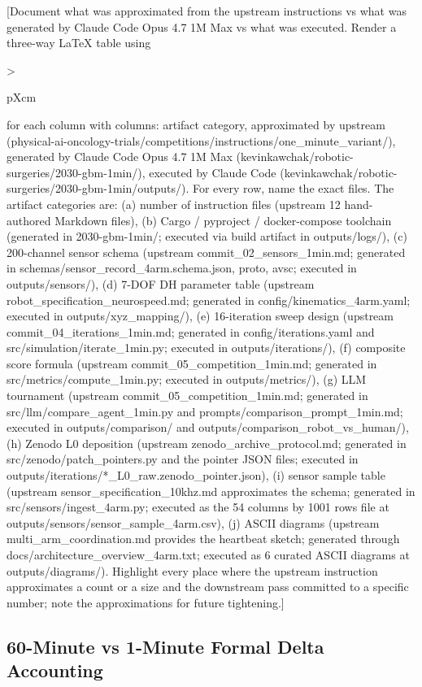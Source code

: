 [Document what was approximated from the upstream instructions vs
what was generated by Claude Code Opus 4.7 1M Max vs what was
executed. Render a three-way LaTeX table using
{>{\raggedright\arraybackslash}p{Xcm}} for each column with columns:
artifact category, approximated by upstream
(physical-ai-oncology-trials/competitions/instructions/one_minute_variant/),
generated by Claude Code Opus 4.7 1M Max
(kevinkawchak/robotic-surgeries/2030-gbm-1min/), executed by Claude
Code (kevinkawchak/robotic-surgeries/2030-gbm-1min/outputs/). For
every row, name the exact files. The artifact categories are: (a)
number of instruction files (upstream 12 hand-authored Markdown
files), (b) Cargo / pyproject / docker-compose toolchain (generated
in 2030-gbm-1min/; executed via build artifact in outputs/logs/),
(c) 200-channel sensor schema (upstream commit_02_sensors_1min.md;
generated in schemas/sensor_record_4arm.{schema.json, proto, avsc};
executed in outputs/sensors/), (d) 7-DOF DH parameter table
(upstream robot_specification_neurospeed.md; generated in
config/kinematics_4arm.yaml; executed in outputs/xyz_mapping/), (e)
16-iteration sweep design (upstream commit_04_iterations_1min.md;
generated in config/iterations.yaml and src/simulation/iterate_1min.py;
executed in outputs/iterations/), (f) composite score formula
(upstream commit_05_competition_1min.md; generated in
src/metrics/compute_1min.py; executed in outputs/metrics/), (g) LLM
tournament (upstream commit_05_competition_1min.md; generated in
src/llm/compare_agent_1min.py and prompts/comparison_prompt_1min.md;
executed in outputs/comparison/ and outputs/comparison_robot_vs_human/),
(h) Zenodo L0 deposition (upstream zenodo_archive_protocol.md;
generated in src/zenodo/patch_pointers.py and the pointer JSON files;
executed in outputs/iterations/*_L0_raw.zenodo_pointer.json), (i)
sensor sample table (upstream sensor_specification_10khz.md
approximates the schema; generated in src/sensors/ingest_4arm.py;
executed as the 54 columns by 1001 rows file at
outputs/sensors/sensor_sample_4arm.csv), (j) ASCII diagrams (upstream
multi_arm_coordination.md provides the heartbeat sketch; generated
through docs/architecture_overview_4arm.txt; executed as 6 curated
ASCII diagrams at outputs/diagrams/). Highlight every place where
the upstream instruction approximates a count or a size and the
downstream pass committed to a specific number; note the
approximations for future tightening.]

\subsection{60-Minute vs 1-Minute Formal Delta Accounting}
\label{sec:limits-deltas}

